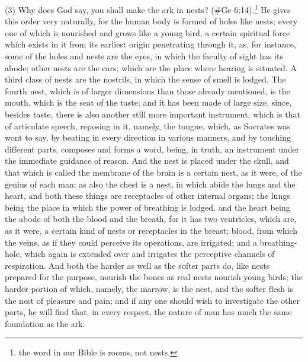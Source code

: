 (3) Why does God say, you shall make the ark in nests? (\#Ge 6:14).\footnote{the word in our Bible is
rooms, not nests.} He gives this order very naturally, for the human body is formed of holes like nests;
every one of which is nourished and grows like a young bird, a certain spiritual force which exists in
it from its earliest origin penetrating through it, as, for instance, some of the holes and nests are
the eyes, in which the faculty of sight has its abode; other nests are the ears, which are the place
where hearing is situated. A third class of nests are the nostrils, in which the sense of smell is
lodged. The fourth nest, which is of larger dimensions than those already mentioned, is the mouth,
which is the seat of the taste; and it has been made of large size, since, besides taste, there is
also another still more important instrument, which is that of articulate speech, reposing in it,
namely, the tongue, which, as Socrates was wont to say, by beating in every direction in various
manners, and by touching different parts, composes and forms a word, being, in truth, an
instrument under the immediate guidance of reason. And the nest is placed under the skull, and
that which is called the membrane of the brain is a certain nest, as it were, of the genius of each
man: as also the chest is a nest, in which abide the lungs and the heart, and both these things are
receptacles of other internal organs; the lungs being the place in which the power of breathing is
lodged, and the heart being the abode of both the blood and the breath, for it has two ventricles,
which are, as it were, a certain kind of nests or receptacles in the breast; blood, from which the
veins, as if they could perceive its operations, are irrigated; and a breathing-hole, which again is
extended over and irrigates the perceptive channels of respiration. And both the harder as well as
the softer parts do, like nests prepared for the purpose, nourish the bones as real nests nourish
young birds; the harder portion of which, namely, the marrow, is the nest, and the softer flesh is the
nest of pleasure and pain; and if any one should wish to investigate the other parts, he will find that,
in every respect, the nature of man has much the same foundation as the ark.

